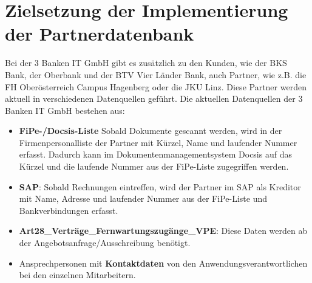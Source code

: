 \section{Zielsetzung der Implementierung der Partnerdatenbank}
Bei der 3 Banken IT GmbH gibt es zusätzlich zu den Kunden, wie der BKS Bank, der Oberbank und der BTV Vier Länder Bank, auch Partner, wie z.B. die FH Oberösterreich Campus Hagenberg oder die JKU Linz. Diese Partner werden aktuell in verschiedenen Datenquellen geführt.
Die aktuellen Datenquellen der 3 Banken IT GmbH bestehen aus:
\begin{itemize}
	\item \textbf{FiPe-/Docsis-Liste} Sobald Dokumente gescannt werden, wird in der Firmenpersonalliste der Partner mit Kürzel, Name und laufender Nummer erfasst. Dadurch kann im Dokumentenmanagementsystem Docsis auf das Kürzel und die laufende Nummer aus der FiPe-Liste zugegriffen werden.
	\item \textbf{SAP}: Sobald Rechnungen eintreffen, wird der Partner im SAP als Kreditor mit Name, Adresse und laufender Nummer aus der FiPe-Liste und Bankverbindungen erfasst.
	\item \textbf{Art28\_Verträge\_Fernwartungszugänge\_VPE}: Diese Daten werden ab der Angebotsanfrage/Ausschreibung benötigt.
	\item Ansprechpersonen mit \textbf{Kontaktdaten} von den Anwendungsverantwortlichen bei den einzelnen Mitarbeitern.
\end{itemize}

